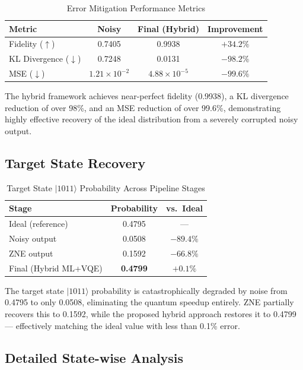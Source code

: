 \documentclass[journal]{IEEEtran}
\begin{document}
\begin{table}[ht]
\caption{Error Mitigation Performance Metrics}
\label{tab:metrics}
\centering
\begin{tabular}{lccc}
\toprule
\textbf{Metric} & \textbf{Noisy} & \textbf{Final (Hybrid)} & \textbf{Improvement} \\
\midrule
Fidelity ($\uparrow$) & 0.7405 & 0.9938 & $+34.2\%$ \\
KL Divergence ($\downarrow$) & 0.7248 & 0.0131 & $-98.2\%$ \\
MSE ($\downarrow$) & $1.21 \times 10^{-2}$ & $4.88 \times 10^{-5}$ & $-99.6\%$ \\
\bottomrule
\end{tabular}
\end{table}

The hybrid framework achieves near-perfect fidelity (0.9938), a KL divergence reduction of over 98\%, and an MSE reduction of over 99.6\%, demonstrating highly effective recovery of the ideal distribution from a severely corrupted noisy output.

\subsection{Target State Recovery}

\begin{table}[ht]
\caption{Target State $|1011\rangle$ Probability Across Pipeline Stages}
\label{tab:target}
\centering
\begin{tabular}{lcc}
\toprule
\textbf{Stage} & \textbf{Probability} & \textbf{vs.\ Ideal} \\
\midrule
Ideal (reference) & 0.4795 & --- \\
Noisy output & 0.0508 & $-89.4\%$ \\
ZNE output & 0.1592 & $-66.8\%$ \\
Final (Hybrid ML+VQE) & \textbf{0.4799} & $+0.1\%$ \\
\bottomrule
\end{tabular}
\end{table}

The target state $|1011\rangle$ probability is catastrophically degraded by noise from 0.4795 to only 0.0508, eliminating the quantum speedup entirely. ZNE partially recovers this to 0.1592, while the proposed hybrid approach restores it to 0.4799 --- effectively matching the ideal value with less than 0.1\% error.

\subsection{Detailed State-wise Analysis}
\end{document}
